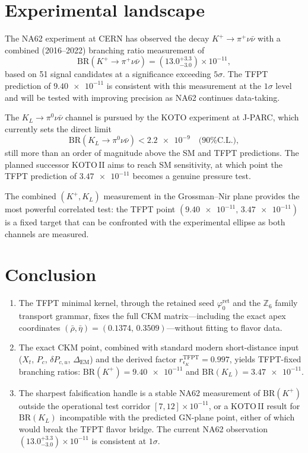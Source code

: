 \documentclass[11pt,a4paper]{article}
\theoremstyle{definition}
\theoremstyle{remark}
\newcommand{\phiz}{\varphi_{0}^{\mathrm{ret}}}
\newcommand{\BR}{\mathrm{BR}}
\numberwithin{equation}{section}
\begin{document}
\section{Experimental landscape}
\label{sec:experiment}

The NA62 experiment at CERN has observed the decay
$K^+\to\pi^+\nu\bar\nu$ with a combined (2016--2022)
branching ratio measurement of \cite{NA62obs}
\[
\BR(K^+\to\pi^+\nu\bar\nu)
=
(13.0^{+3.3}_{-3.0})\times 10^{-11},
\]
based on 51 signal candidates at a significance exceeding $5\sigma$.
The TFPT prediction of $\num{9.40e-11}$ is consistent with this
measurement at the $1\sigma$ level and will be tested with improving
precision as NA62 continues data-taking.

The $K_L\to\pi^0\nu\bar\nu$ channel is pursued by the KOTO experiment
at J-PARC, which currently sets the direct limit \cite{KOTO}
\[
\BR(K_L\to\pi^0\nu\bar\nu)<\num{2.2e-9}
\quad\text{(90\% C.L.)},
\]
still more than an order of magnitude above the SM and TFPT predictions.
The planned successor KOTO\,II aims to reach SM sensitivity, at which
point the TFPT prediction of $\num{3.47e-11}$ becomes a genuine
pressure test.

The combined $(K^+,K_L)$ measurement in the Grossman--Nir plane
provides the most powerful correlated test: the TFPT point
$(\num{9.40e-11},\,\num{3.47e-11})$ is a fixed target that can be
confronted with the experimental ellipse as both channels are measured.


\section{Conclusion}
\label{sec:conclusion}

\begin{tcolorbox}[colback=gray!4, colframe=gray!60, breakable,
    title={\textbf{Summary}}, fonttitle=\bfseries]
\begin{enumerate}[label=\arabic*., leftmargin=1.6em, itemsep=0.3em]
\item The TFPT minimal kernel, through the retained seed $\phiz$ and the
$\mathbb Z_6$ family transport grammar, fixes the full CKM matrix---including
the exact apex coordinates $(\bar\rho,\bar\eta)=(0.1374,\,0.3509)$---without
fitting to flavor data.
\item The exact CKM point, combined with standard modern short-distance input
($X_t$, $P_c$, $\delta P_{c,u}$, $\Delta_{\mathrm{EM}}$) and the
derived factor $r_{\epsilon_K}^{\mathrm{TFPT}}=0.997$,
yields TFPT-fixed branching ratios:
$\BR(K^+)=\num{9.40e-11}$ and $\BR(K_L)=\num{3.47e-11}$.
\item The sharpest falsification handle is a stable NA62 measurement of
$\BR(K^+)$ outside the operational test corridor $[7,12]\times 10^{-11}$,
or a KOTO\,II result for $\BR(K_L)$ incompatible with the predicted
GN-plane point, either of which would break the TFPT flavor bridge.
The current NA62 observation $(13.0^{+3.3}_{-3.0})\times 10^{-11}$
is consistent at $1\sigma$.
\end{enumerate}
\end{tcolorbox}
\end{document}
